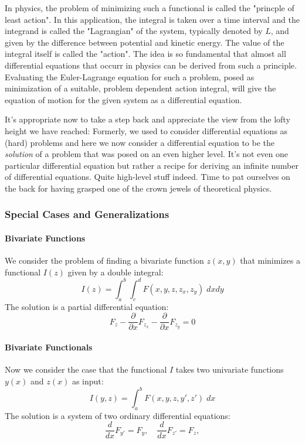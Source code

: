 \medskip
In physics, the problem of minimizing such a functional is called the "princple of least action". In this application, the integral is taken over a time interval and the integrand is called the "Lagrangian" of the system, typically denoted by $L$, and given by the difference between potential and kinetic energy. The value of the integral itself is called the "action". The idea is so fundamental that almost all differential equations that occurr in physics can be derived from such a principle. Evaluating the Euler-Lagrange equation for such a problem, posed as minimization of a suitable, problem dependent action integral, will give the equation of motion for the given system as a differential equation.

\medskip
It's appropriate now to take a step back and appreciate the view from the lofty height we have reached:  Formerly, we used to consider differential equations as (hard) problems and here we now consider a differential equation to be the \emph{solution} of a problem that was posed on an even higher level. It's not even one particular differential equation but rather a recipe for deriving an infinite number of differential equations. Quite high-level stuff indeed. Time to pat ourselves on the back for having grasped one of the crown jewels of theoretical physics. 


\subsubsection{Special Cases and Generalizations}


\paragraph{Bivariate Functions} We consider the problem of finding a bivariate function $z(x,y)$ that minimizes a functional $I(z)$ given by a double integral:
\begin{equation}
 I(z) = \int_a^b \int_c^d  F(x,y,z,z_x,z_y ) \; dx dy
\end{equation}
The solution is a partial differential equation:
\begin{equation}
 F_z - \frac{\partial}{\partial x} F_{z_x} - \frac{\partial}{\partial x} F_{z_y} = 0
\end{equation}

\paragraph{Bivariate Functionals} Now we consider the case that the functional $I$ takes two univariate functions $y(x)$ and $z(x)$ as input:
\begin{equation}
 I(y,z) = \int_a^b F(x,y,z,y',z' ) \; dx
\end{equation}
The solution is a system of two ordinary differential equations:
\begin{equation}
 \frac{d}{d x} F_{y'} = F_y, \quad
 \frac{d}{d x} F_{z'} = F_z,
\end{equation}



